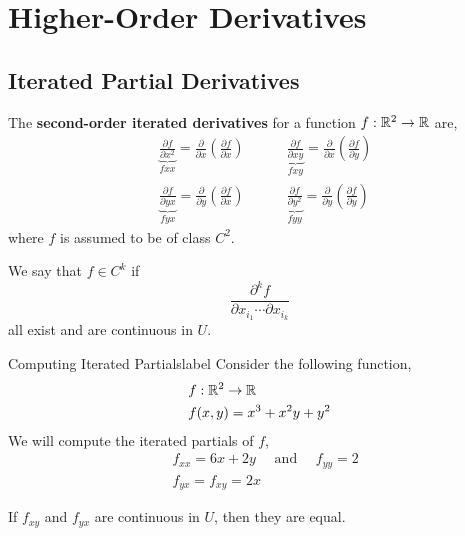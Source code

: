 \section{Higher-Order Derivatives}
\subsection{Iterated Partial Derivatives}
The \textbf{second-order iterated derivatives} for a function $f: \mathbb{R}^2\rightarrow \mathbb{R}$ are,
\begin{align*}
&\underbrace{\frac{\partial f}{\partial x^2}}_{f x x}=\frac{\partial}{\partial x}\left(\frac{\partial f}{\partial x}\right) \quad\quad\quad \underbrace{\frac{\partial f}{\partial x y}}_{f x y}=\frac{\partial}{\partial x}\left(\frac{\partial f}{\partial y}\right)\\
&\underbrace{\frac{\partial f}{\partial y x}}_{f y x}=\frac{\partial}{\partial y}\left(\frac{\partial f}{\partial x}\right) \quad\quad\quad \underbrace{\frac{\partial f}{\partial y^2}}_{f y y}=\frac{\partial}{\partial y}\left(\frac{\partial f}{\partial y}\right)
\end{align*}
where $f$ is assumed to be of class $C^2$.

\begin{marginfigure}
    We say that $f \in C^k$ if
    \[\frac{\partial^k f}{\partial x_{i_1} \cdots \partial x_{i_k}}\]
    all exist and are continuous in $U$.
\end{marginfigure}

\begin{ex}{Computing Iterated Partials}{label}
    Consider the following function,
    \begin{align*}
        &f: \mathbb{R}^2 \rightarrow \mathbb{R} \\
        &f(x, y)=x^3+x^2 y+y^2
    \end{align*}
    We will compute the iterated partials of $f$,
    \begin{align*}
        &f_{xx} = 6 x+2 y \quad \text{ and } \quad f_{yy}=2 \\
        &f_{yx}= f_{xy}=2 x
    \end{align*}
\end{ex}

\begin{thm}
   If $f_{xy}$ and $f_{yx}$ are continuous in $U$, then they are equal.
\end{thm}

